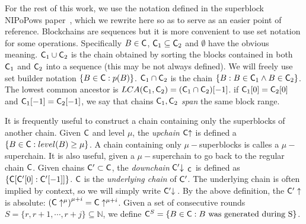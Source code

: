 For the rest of this work, we use the notation defined in the superblock NIPoPows paper~\cite{nipopows}, which we rewrite here so as to serve as an easier point of reference.
Blockchains are sequences but it is more convenient to use set notation for some operations. Specifically $B \in \mathsf{C}$, $\mathsf{C}_1 \subseteq \mathsf{C}_2$ and $\emptyset$ have the obvious meaning. $\mathsf{C}_1 \cup \mathsf{C}_2$ is the chain obtained by sorting the blocks contained in both $\mathsf{C}_1$ and $\mathsf{C}_2$ into a sequence (this may be not always defined). We will freely use set builder notation $\{ B \in \mathsf{C}: p(B)\}$. $\mathsf{C}_1 \cap \mathsf{C}_2$ is the chain $\{B: B \in \mathsf{C}_1 \wedge B \in \mathsf{C}_2 \}$. The lowest common ancestor is $LCA(\mathsf{C}_1, \mathsf{C}_2) = (\mathsf{C}_1 \cap \mathsf{C}_2)[-1]$. if $\mathsf{C}_1[0] = \mathsf{C}_2[0]$ and $\mathsf{C}_1[-1] = \mathsf{C}_2[-1]$, we say that chains $\mathsf{C}_1, \mathsf{C}_2$ \emph{span} the same block range. 

It is frequently useful to construct a chain containing only the superblocks of another chain. Given $\mathsf{C}$ and level $\mu$, the \emph{upchain} $\mathsf{C}\negthickspace\uparrow$ is defined a $\{B \in \mathsf{C}: level(B) \geq \mu \}$. A chain containing only $\mu-$superblocks is calles a $\mu-$superchain. It is also useful, given a $\mu-$superchain to go back to the regular chain $\mathsf{C}$. Given chains $\mathsf{C}' \subset \mathsf{C}$, the \emph{downchain} $\mathsf{C}' \negthickspace\downarrow\,_{\mathsf{C}}$ is defined as $\{ \mathsf{C}[\mathsf{C}'[0]:\mathsf{C}'[-1]] \}$. $\mathsf{C}$ is the \emph{underlying chain} of $\mathsf{C}'$. The underlying chain is often implied by context, so we will simply write $\mathsf{C}' \negthickspace\downarrow\,$. By the above definition, the $\mathsf{C}' \uparrow$ is absolute: $\left( \mathsf{C} \uparrow^\mu \right)^{\mu + i} = \mathsf{C} \uparrow^{\mu + i}$. Given a set of consecutive rounds $S = \{ r, r+1, \cdots, r+j \} \subseteq \mathbb{N}$, we define $\mathsf{C}^S = \{ B \in \mathsf{C}: B \text{ was generated during S} \}$.